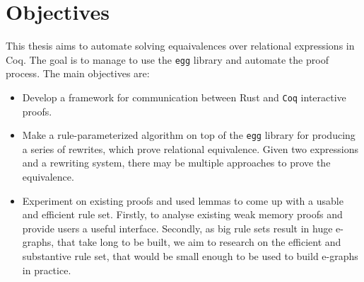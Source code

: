 \section{Objectives}
This thesis aims to automate solving equaivalences over relational expressions in Coq. The goal is to manage to use the \texttt{egg} library and automate the proof process. The main objectives are:
\begin{itemize}
    \item Develop a framework for communication between Rust and \texttt{Coq} interactive proofs.
    \item Make a rule-parameterized algorithm on top of the \texttt{egg} library for producing a series of rewrites, which prove relational equivalence. Given two expressions and a rewriting system, there may be multiple approaches to prove the equivalence. 
    \item Experiment on existing proofs and used lemmas to come up with a usable and efficient rule set. Firstly, to analyse existing weak memory proofs and provide users a useful interface. Secondly, as big rule sets result in huge e-graphs, that take long to be built, we aim to research on the efficient and substantive rule set, that would be small enough to be used to build e-graphs in practice.
\end{itemize}